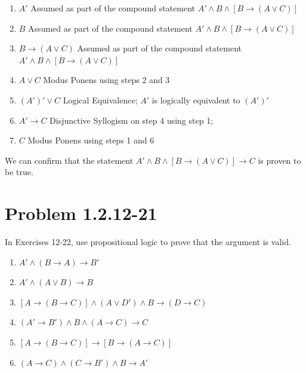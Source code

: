 \documentclass[12pt]{article}
\begin{document}
\begin{enumerate}
    \item \( A' \) \hfill Assumed as part of the compound statement \( A' \land B \land [B \rightarrow (A \lor C)] \)
    
    \item \( B \) \hfill Assumed as part of the compound statement \( A' \land B \land [B \rightarrow (A \lor C)] \)
    
    \item \( B \rightarrow (A \lor C) \) \hfill Assumed as part of the compound statement \( A' \land B \land [B \rightarrow (A \lor C)] \)
    
    \item \( A \lor C \) \hfill Modus Ponens using steps 2 and 3
    
    \item \( (A')' \lor C \) \hfill Logical Equivalence; \( A' \) is logically equivalent to \( (A')' \)
    
    \item \( A' \rightarrow C \) \hfill Disjunctive Syllogism on step 4 using step 1;
    
    \item \( C \) \hfill Modus Ponens using steps 1 and 6
\end{enumerate}
We can confirm that the statement \( A' \land B \land [B \rightarrow (A \lor C)] \rightarrow C \) is proven to be true.



\newpage
\section*{Problem 1.2.12-21}
In Exercises 12-22, use propositional logic to prove that the argument is valid.
\begin{enumerate}
    \item[12.] \( A' \land (B \to A) \to B' \)
    \item[15.] \( A' \land (A \lor B) \to B \)
    \item[16.] \( [A \to (B \to C)] \land (A \lor D') \land B \to (D \to C) \)
    \item[17.] \( (A' \to B') \land B \land (A \to C) \to C \)
    \item[19.] \( [A \to (B \to C)] \to [B \to (A \to C)] \)
    \item[21.] \( (A \to C) \land (C \to B') \land B \to A' \)
\end{enumerate}


\newpage
\end{document}
